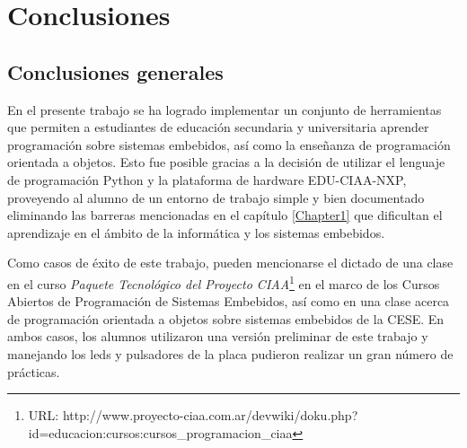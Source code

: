 
\chapter{Conclusiones} %

\label{Chapter5} %




\section{Conclusiones generales }

En el presente trabajo se ha logrado implementar un conjunto de herramientas que permiten a estudiantes  de educación secundaria y universitaria aprender programación sobre sistemas embebidos, así como la enseñanza de programación orientada a objetos. Esto fue posible gracias a la decisión de utilizar el lenguaje de programación Python y la plataforma de hardware EDU-CIAA-NXP, proveyendo al alumno de un entorno de trabajo simple y bien documentado eliminando las barreras mencionadas en el capítulo \ref{Chapter1} que dificultan el aprendizaje en el ámbito de la informática y los sistemas embebidos.

Como casos de éxito de este trabajo, pueden mencionarse el dictado de una clase en el curso \textit{Paquete Tecnológico del Proyecto CIAA}\footnote{URL: http://www.proyecto-ciaa.com.ar/devwiki/doku.php?id=educacion:cursos:cursos\_programacion\_ciaa} en el marco de los Cursos Abiertos de Programación de Sistemas Embebidos, así como en una clase acerca de programación orientada a objetos sobre sistemas embebidos de la CESE. En ambos casos, los alumnos utilizaron una versión preliminar de este trabajo y manejando los leds y pulsadores de la placa pudieron realizar un gran número de prácticas.


